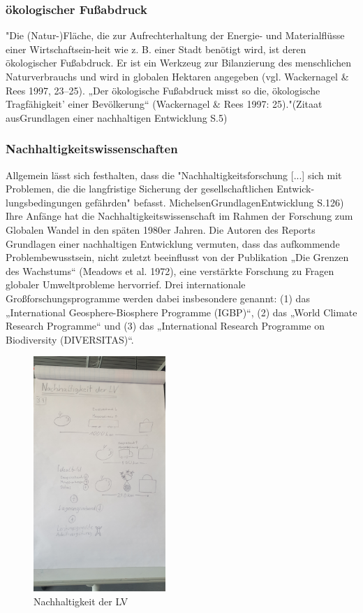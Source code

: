 \documentclass{article}
\begin{document}
\subsubsection{ökologischer Fußabdruck}
"Die (Natur-)Fläche, die zur Aufrechterhaltung der Energie- und Materialflüsse einer Wirtschaftsein-heit wie z. B. einer Stadt benötigt wird, ist deren ökologischer Fußabdruck. Er ist ein Werkzeug zur Bilanzierung des menschlichen Naturverbrauchs und wird in globalen Hektaren angegeben (vgl. Wackernagel & Rees 1997, 23–25). „Der ökologische Fußabdruck misst so die‚ ökologische Tragfähigkeit’ einer Bevölkerung“ (Wackernagel & Rees 1997: 25)."(Zitaat ausGrundlagen einer nachhaltigen Entwicklung S.5)

\subsubsection{Nachhaltigkeitswissenschaften}
Allgemein lässt sich festhalten, dass die "Nachhaltigkeitsforschung [...] sich mit Problemen, die die langfristige Sicherung der gesellschaftlichen Entwick-lungsbedingungen gefährden" befasst. MichelsenGrundlagenEntwicklung \cite{Grundlagen einer nachhaltigen Entwicklung} S.126)
Ihre Anfänge hat die Nachhaltigkeitswissenschaft im Rahmen der Forschung zum Globalen Wandel in den späten 1980er Jahren. Die Autoren des Reports Grundlagen einer nachhaltigen Entwicklung vermuten, dass das aufkommende Problembewusstsein, nicht zuletzt beeinflusst von der Publikation „Die Grenzen des Wachstums“ (Meadows et al. 1972), eine verstärkte Forschung zu Fragen globaler Umweltprobleme hervorrief.
Drei internationale Großforschungsprogramme werden dabei insbesondere genannt: (1) das „International Geosphere-Biosphere Programme (IGBP)“, (2) das „World Climate Research Programme“ und (3) das
„International Research Programme on Biodiversity (DIVERSITAS)“.


\begin{figure}[htp]
\centering
\includegraphics[width=5cm]{image_folder/skizze1.jpg}
\caption{Nachhaltigkeit der LV}
\label{fig:Skizze_Nachhaltigkeit}
\end{figure}
\end{document}
